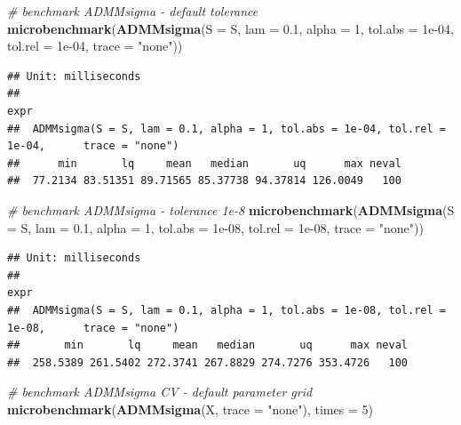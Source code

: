 \documentclass[12pt,]{book}
\newenvironment{Shaded}{\begin{snugshade}}{\end{snugshade}}
\newcommand{\CommentTok}[1]{\textcolor[rgb]{0.56,0.35,0.01}{\textit{#1}}}
\newcommand{\DataTypeTok}[1]{\textcolor[rgb]{0.13,0.29,0.53}{#1}}
\newcommand{\DecValTok}[1]{\textcolor[rgb]{0.00,0.00,0.81}{#1}}
\newcommand{\FloatTok}[1]{\textcolor[rgb]{0.00,0.00,0.81}{#1}}
\newcommand{\KeywordTok}[1]{\textcolor[rgb]{0.13,0.29,0.53}{\textbf{#1}}}
\newcommand{\NormalTok}[1]{#1}
\newcommand{\StringTok}[1]{\textcolor[rgb]{0.31,0.60,0.02}{#1}}
\theoremstyle{definition}
\theoremstyle{definition}
\theoremstyle{definition}
\theoremstyle{remark}
\begin{document}
\begin{Shaded}
\begin{Highlighting}[]
\CommentTok{# benchmark ADMMsigma - default tolerance}
\KeywordTok{microbenchmark}\NormalTok{(}\KeywordTok{ADMMsigma}\NormalTok{(}\DataTypeTok{S =}\NormalTok{ S, }\DataTypeTok{lam =} \FloatTok{0.1}\NormalTok{, }\DataTypeTok{alpha =} \DecValTok{1}\NormalTok{, }\DataTypeTok{tol.abs =} \FloatTok{1e-04}\NormalTok{, }\DataTypeTok{tol.rel =} \FloatTok{1e-04}\NormalTok{, }
    \DataTypeTok{trace =} \StringTok{"none"}\NormalTok{))}
\end{Highlighting}
\end{Shaded}

\begin{verbatim}
## Unit: milliseconds
##                                                                                           expr
##  ADMMsigma(S = S, lam = 0.1, alpha = 1, tol.abs = 1e-04, tol.rel = 1e-04,      trace = "none")
##      min       lq     mean   median       uq      max neval
##  77.2134 83.51351 89.71565 85.37738 94.37814 126.0049   100
\end{verbatim}

\begin{Shaded}
\begin{Highlighting}[]
\CommentTok{# benchmark ADMMsigma - tolerance 1e-8}
\KeywordTok{microbenchmark}\NormalTok{(}\KeywordTok{ADMMsigma}\NormalTok{(}\DataTypeTok{S =}\NormalTok{ S, }\DataTypeTok{lam =} \FloatTok{0.1}\NormalTok{, }\DataTypeTok{alpha =} \DecValTok{1}\NormalTok{, }\DataTypeTok{tol.abs =} \FloatTok{1e-08}\NormalTok{, }\DataTypeTok{tol.rel =} \FloatTok{1e-08}\NormalTok{, }
    \DataTypeTok{trace =} \StringTok{"none"}\NormalTok{))}
\end{Highlighting}
\end{Shaded}

\begin{verbatim}
## Unit: milliseconds
##                                                                                           expr
##  ADMMsigma(S = S, lam = 0.1, alpha = 1, tol.abs = 1e-08, tol.rel = 1e-08,      trace = "none")
##       min       lq     mean   median       uq      max neval
##  258.5389 261.5402 272.3741 267.8829 274.7276 353.4726   100
\end{verbatim}

\begin{Shaded}
\begin{Highlighting}[]
\CommentTok{# benchmark ADMMsigma CV - default parameter grid}
\KeywordTok{microbenchmark}\NormalTok{(}\KeywordTok{ADMMsigma}\NormalTok{(X, }\DataTypeTok{trace =} \StringTok{"none"}\NormalTok{), }\DataTypeTok{times =} \DecValTok{5}\NormalTok{)}
\end{Highlighting}
\end{Shaded}
\end{document}
